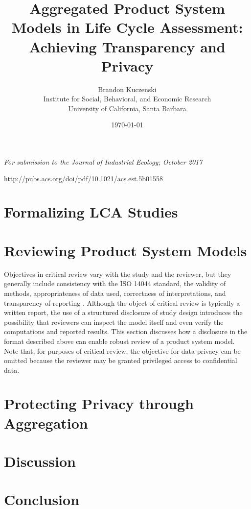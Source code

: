 \documentclass[12pt]{article}
\title{Aggregated Product System Models in Life Cycle Assessment: Achieving Transparency and Privacy}
\author{Brandon Kuczenski\\
Institute for Social, Behavioral, and Economic Research\\
University of California, Santa Barbara}
\date{\mydate\today}
\def\mainpaper{

  \maketitle
  \emph{For submission to the Journal of Industrial Ecology; October 2017}

  

  \doublespacing

  {\red http://pubs.acs.org/doi/pdf/10.1021/acs.est.5b01558}

  
\section{Formalizing LCA Studies}

  
  


\section{Reviewing Product System Models}

Objectives in critical review vary with the study and the reviewer, but they generally include consistency with the ISO 14044 standard, the validity of methods, appropriateness of data used, correctness of interpretations, and transparency of reporting \citep[Section 6.1]{iso14044}.  Although the object of critical review is typically a written report, the use of a structured disclosure of study design introduces the possibility that reviewers can inspect the model itself and even verify the computations and reported results.  This section discusses how a disclosure in the format described above can enable robust review of a product system model.  Note that, for purposes of critical review, the objective for data privacy can be omitted because the reviewer may be granted privileged access to confidential data.

  

\section{Protecting Privacy through Aggregation}




\section{Discussion}




\section{Conclusion} 



  
  


  \singlespacing
  
}
\def\supporting{
  \renewcommand{\thefigure}{S\arabic{figure}}
  \renewcommand{\thetable}{S\arabic{table}}

  \maketitle

  \begin{center}
    \Large Supporting Information
  \end{center}

  \doublespacing

  

  
  
  
  
  

  \singlespacing
}
\def\unused{
  
}
\begin{document}
\mainpaper

\end{document}
